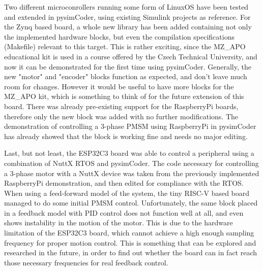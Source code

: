 \quad Two different microconrollers running some form of LinuxOS have been tested and extended
in pysimCoder, using existing Simulink projects as reference. For the Zynq based board, a whole
new library has been added containing not only the implemented hardware blocks, but even the
compilation specifications (Makefile) relevant to this target. This is rather exciting, since
the MZ_APO educational kit is used in a course offered by the Czech Technical University, and
now it can be demonstrated for the first time using pysimCoder. Generally, the new "motor" and
"encoder" blocks function as expected, and don't leave much room for changes. However it would be
useful to have more blocks for the MZ_APO kit, which is something to think of for the future
extension of this board. There was already pre-existing support for the RaspberryPi boards,
therefore only the new block was added with no further modifications. The demonstration of
controlling a 3-phase PMSM using RaspberryPi in pysimCoder has already showed that the block is
working fine and needs no major editing. 

\quad Last, but not least, the ESP32C3 board was able to control a peripheral using a combination
of NuttX RTOS and pysimCoder. The code necessary for controlling a 3-phase motor with a NuttX
device was taken from the previously implemented RaspberryPi demonstration, and then edited for
compliance with the RTOS. When using a feed-forward model of the system, the tiny RISC-V based
board managed to do some initial PMSM control. Unfortunately, the same block placed in a feedback
model with PID control does not function well at all, and even shows instability in the motion of
the motor. This is due to the hardware limitation of the ESP32C3 board, which cannot achieve a
high enough sampling frequency for proper motion control. This is something that can be explored
and researched in the future, in order to find out whether the board can in fact reach those
necessary frequencies for real feedback control. 